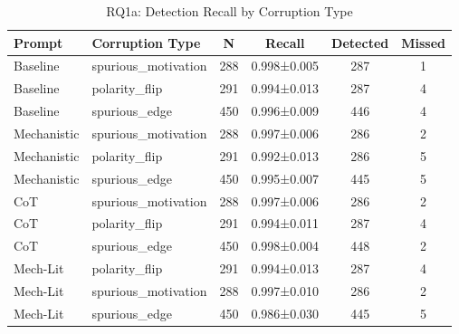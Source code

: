\begin{table}[htbp]
\centreing
\caption{RQ1a: Detection Recall by Corruption Type}
\label{tab:rq1a_corruption_type}
\begin{tabular}{llcccc}
\toprule
\textbf{Prompt} & \textbf{Corruption Type} & \textbf{N} & \textbf{Recall} & \textbf{Detected} & \textbf{Missed} \\
\midrule
Baseline & spurious_motivation & 288 & 0.998±0.005 & 287 & 1 \\
Baseline & polarity_flip & 291 & 0.994±0.013 & 287 & 4 \\
Baseline & spurious_edge & 450 & 0.996±0.009 & 446 & 4 \\
Mechanistic & spurious_motivation & 288 & 0.997±0.006 & 286 & 2 \\
Mechanistic & polarity_flip & 291 & 0.992±0.013 & 286 & 5 \\
Mechanistic & spurious_edge & 450 & 0.995±0.007 & 445 & 5 \\
CoT & spurious_motivation & 288 & 0.997±0.006 & 286 & 2 \\
CoT & polarity_flip & 291 & 0.994±0.011 & 287 & 4 \\
CoT & spurious_edge & 450 & 0.998±0.004 & 448 & 2 \\
Mech-Lit & polarity_flip & 291 & 0.994±0.013 & 287 & 4 \\
Mech-Lit & spurious_motivation & 288 & 0.997±0.010 & 286 & 2 \\
Mech-Lit & spurious_edge & 450 & 0.986±0.030 & 445 & 5 \\
\bottomrule
\end{tabular}
\end{table}